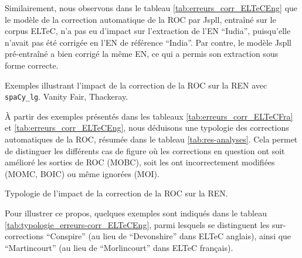 Similairement, nous observons dans le tableau \ref{tab:erreurs_corr_ELTeCEng} que le modèle de la correction automatique de la ROC par Jspll, entraîné sur le corpus ELTeC, n'a pas eu d'impact sur l'extraction de l'EN ``Iudia'', puisqu'elle n'avait pas été corrigée en l'EN de référence ``India''. Par contre, le modèle Jspll pré-entraîné a bien corrigé la même EN, ce qui a permis son extraction sous forme correcte.
\begin{table}[h!]
\footnotesize
    \centering
   
    \caption{Exemples illustrant l'impact de la correction de la ROC sur la REN avec \texttt{spaCy\_lg}. {\normalfont Vanity Fair}, Thackeray.}
    \label{tab:erreurs_corr_ELTeCEng}
\end{table}
À partir des exemples présentés dans les tableaux \ref{tab:erreurs_corr_ELTeCFra} et \ref{tab:erreurs_corr_ELTeCEng}, nous déduisons une typologie des corrections automatiques de la ROC, résumée dans le tableau \ref{tab:res-analyses}. Cela permet de distinguer les différents cas de figure où les corrections en question ont soit amélioré les sorties de ROC (MOBC), soit les ont incorrectement modifiées (MOMC, BOIC) ou même ignorées (MOI).
\begin{table}[h!]
\footnotesize
    \centering
    
    \caption{Typologie de l'impact de la correction de la ROC sur la REN.  }
    \label{tab:res-analyses}
\end{table}

Pour illustrer ce propos, quelques exemples sont indiqués dans le tableau \ref{tab:typologie_erreurs-corr_ELTeCEng}, 
parmi lesquels se distinguent les sur-corrections ``Conspire'' 
(au lieu de ``Devonshire'' 
dans ELTeC anglais), ainsi que ``Martincourt'' (au lieu de ``Morlincourt'' dans ELTeC français).


